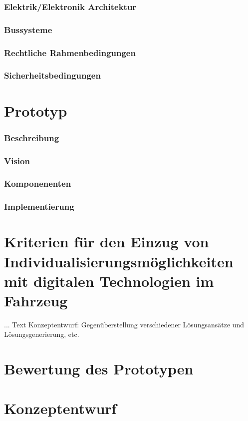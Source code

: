 \subsection{Elektrik/Elektronik Architektur}
\subsection{Bussysteme}
\subsection{Rechtliche Rahmenbedingungen}
\subsection{Sicherheitsbedingungen}


\chapter{Prototyp}
\label{cha:Prototyp}
\subsection{Beschreibung}
\subsection{Vision}
\subsection{Komponenenten}
\subsection{Implementierung}


\chapter{Kriterien für den Einzug von Individualisierungsmöglichkeiten mit digitalen Technologien im Fahrzeug }
\label{cha:Kriterien}

... Text Konzeptentwurf: Gegenüberstellung verschiedener Lösungsansätze und Lösungsgenerierung, etc.

\chapter{Bewertung des Prototypen}
\label{cha:Bewertung}

\chapter{Konzeptentwurf}
\label{cha:Konzeptentwurf}

